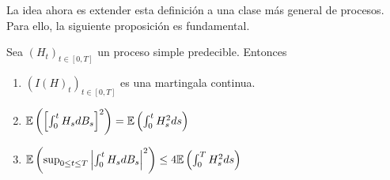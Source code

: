 \newp La idea ahora es extender esta definición a una clase más general de procesos. Para ello, la siguiente proposición es fundamental. 
\begin{proposition}
Sea $(H_t)_{t \in [0,T]} $ un proceso simple predecible. Entonces
\begin{enumerate}
    \item \label{ie:i}$(I(H)_t)_{t \in [0,T]}$ es una martingala continua. 
    \item \label{ie:ii} $\mathbb{E} \left( \left[ \int_{0}^{t} H_s dB_s   \right]^{2} \right) = \mathbb{E} \left( \int_{0}^{t} H^2_s ds\right)$
    \item \label{ie:iii} $\mathbb{E} \left( \sup_{0 \le  t \le T} \abs{\int_{0}^{t} H_s dB_s}^{2} \right)   \le  4 \mathbb{E}\left( \int_{0}^{T} H^2_s ds \right)  $  
\end{enumerate}
\end{proposition}
